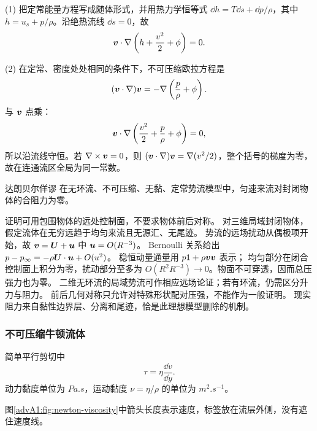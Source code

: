 {\begin{advsolution}
(1) 把定常能量方程写成随体形式，并用热力学恒等式
$\dd h=T\dd s+\dd p/\rho$，其中 $h=u_s+p/\rho$。沿绝热流线
$\dd s=0$，故
\[
 \bm{v}\cdot\nabla\left(
 h+\frac{v^2}{2}+\phi\right)=0.
\]

(2) 在定常、密度处处相同的条件下，不可压缩欧拉方程是
\[
 (\bm{v}\cdot\nabla)\bm{v}
 =-\nabla\left(\frac p\rho+\phi\right).
\]
与 $\bm{v}$ 点乘：
\[
 \bm{v}\cdot\nabla\left(
 \frac{v^2}{2}+\frac p\rho+\phi\right)=0,
\]
所以沿流线守恒。若 $\nabla\times\bm{v}=0$，则
$(\bm{v}\cdot\nabla)\bm{v}=\nabla(v^2/2)$，整个括号的梯度为零，故在连通流区全局为同一常数。
\end{advsolution}

\begin{advtheorem}{达朗贝尔佯谬}\label{advA1:thm:dalembert}
在无环流、不可压缩、无黏、定常势流模型中，匀速来流对封闭物体的合阻力为零。
\end{advtheorem}
证明可用包围物体的远处控制面，不要求物体前后对称。
对三维局域封闭物体，假定流体在无穷远趋于均匀来流且无源汇、无尾迹。
势流的远场扰动从偶极项开始，故
$\bm{v}=\bm{U}+\bm{u}$ 中 $\bm{u}=O(R^{-3})$。
Bernoulli 关系给出 $p-p_\infty=-\rho\bm{U}\cdot\bm{u}+O(u^2)$。
稳恒动量通量用 $p\mathsf1+\rho\bm{v}\bm{v}$ 表示；
均匀部分在闭合控制面上积分为零，扰动部分至多为
$O(R^2R^{-3})\to0$。物面不可穿透，因而总压强力也为零。
二维无环流的局域势流可作相应远场论证；若有环流，仍需区分升力与阻力。
前后几何对称只允许对特殊形状配对压强，不能作为一般证明。
现实阻力来自黏性边界层、分离和尾迹，恰是此理想模型删除的机制。

\subsubsection{不可压缩牛顿流体}

简单平行剪切中
\[
 \tau=\eta\frac{\dd v}{\dd y}.
\]
动力黏度单位为 $\si{Pa.s}$，运动黏度 $\nu=\eta/\rho$ 的单位为
$\si{m^2.s^{-1}}$。
\begin{center}\begin{minipage}{\linewidth}\centering
{}
\label{advA1:fig:newton-viscosity}
\end{minipage}\end{center}
图\ref{advA1:fig:newton-viscosity}中箭头长度表示速度，标签放在流层外侧，没有遮住速度线。

}
